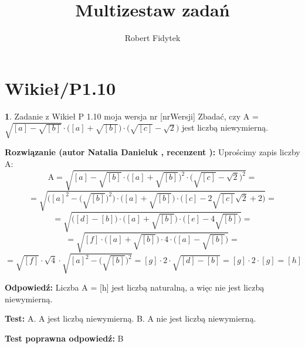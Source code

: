 \documentclass[12pt, a4paper]{article}
\title{Multizestaw zadań}
\author{Robert Fidytek}
\date{}
\theoremstyle{definition} %
\newtheorem{zad}{}
\newcommand{\kategoria}[1]{\section{#1}} %
\newcommand{\zadStart}[1]{\begin{zad}#1\newline} %
\newcommand{\zadStop}{\end{zad}}   %
\newcommand{\rozwStart}[2]{\noindent \textbf{Rozwiązanie (autor #1 , recenzent #2): }\newline} %
\newcommand{\rozwStop}{\newline}                                            %
\newcommand{\odpStart}{\noindent \textbf{Odpowiedź:}\newline}    %
\newcommand{\odpStop}{\newline}                                             %
\newcommand{\testStart}{\noindent \textbf{Test:}\newline} %
\newcommand{\testStop}{\newline} %
\newcommand{\kluczStart}{\noindent \textbf{Test poprawna odpowiedź:}\newline} %
\newcommand{\kluczStop}{\newline} %
\begin{document}
\maketitle

\kategoria{Wikieł/P1.10}

\zadStart{Zadanie z Wikieł P 1.10 moja wersja nr [nrWersji]}
Zbadać, czy A = $ \sqrt{ [a] - \sqrt{ [b] } } \cdot \big ( [a] + \sqrt{ [b] } \big ) \cdot \big ( \sqrt{ [c] } - \sqrt{ 2 } \big )$ jest liczbą niewymierną.
\zadStop

\rozwStart{Natalia Danieluk}{}
Uprościmy zapis liczby A:
$$ \text{A} = \sqrt{ [a] - \sqrt{ [b] } \cdot \big ( [a] + \sqrt{ [b] } \big )^2 \cdot \big ( \sqrt{ [c] } - \sqrt{ 2 } \big )^2 } = $$ 
$$ = \sqrt{ \Big ( [a]^2 - \big (\sqrt{ [b] } \big )^2 \Big ) \cdot \big ( [a] + \sqrt{ [b] } \big ) \cdot \big ( [c]  - 2\sqrt{ [c] }\sqrt{ 2 } + 2 \big ) } = $$ 
$$ = \sqrt{ \big ( [d] - [b] \big ) \cdot \big ( [a] + \sqrt{ [b] } \big ) \cdot \big ( [e]  - 4\sqrt{ [b] } \big ) } = $$ 
$$ = \sqrt{ [f] \cdot \big ( [a] + \sqrt{ [b] } \big ) \cdot 4 \cdot \big ( [a]  - \sqrt{ [b] } \big ) } = $$ 
$$ = \sqrt{ [f] } \cdot \sqrt{ 4 } \cdot \sqrt{ [a]^2 - \big (\sqrt{ [b] } \big )^2 } = 
[g] \cdot 2 \cdot \sqrt{ [d] - [b] } = [g] \cdot 2 \cdot [g] = [h]$$ 
\rozwStop

\odpStart
Liczba A = [h] jest liczbą naturalną, a więc nie jest liczbą niewymierną.
\odpStop

\testStart
A. A jest liczbą niewymierną.
B. A nie jest liczbą niewymierną.
\testStop

\kluczStart
B
\kluczStop
\end{document}
